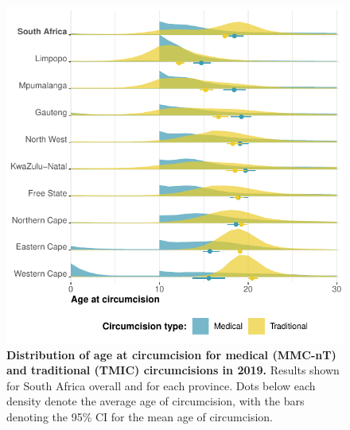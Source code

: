 \documentclass{article}
\begin{document}
\begin{figure}[H]
  \centering
  \includegraphics[width = 5.0in]{Figures/paper/Figure6.pdf}
  \caption{{\bf Distribution of age at circumcision for medical (MMC-nT) and traditional (TMIC) circumcisions in 2019.} Results shown for South Africa overall and for each province. Dots below each density denote the average age of circumcision, with the bars denoting the 95\% CI for the mean age of circumcision.}
  \label{fig::avgageofcirc}
\end{figure}

\end{document}

